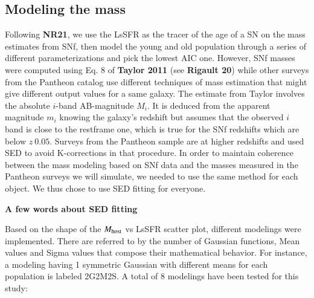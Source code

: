 \documentclass[]{aa}
\begin{document}
\subsection{Modeling the mass}
Following \textbf{NR21}, we use the LsSFR as the tracer of the age of a SN on
the mass estimates from SNf, then model the young and old population through a
series of different parameterizations and pick the lowest AIC one. However, SNf
masses were computed using Eq. 8 of \textbf{Taylor 2011} (see \textbf{Rigault
20}) while other surveys from the Pantheon catalog use different techniques of
mass estimation that might give different output values for a same galaxy. The
estimate from Taylor involves the absolute $i$-band AB-magnitude $M_i$. It is
deduced from the apparent magnitude $m_i$ knowing the galaxy's redshift but
assumes that the observed $i$ band is close to the restframe one, which is true
for the SNf redshifts which are below $z~0.05$. Surveys from the Pantheon sample
are at higher redshifts and used SED to avoid K-corrections in that procedure.
In order to maintain coherence between the mass modeling based on SNf data and
the masses measured in the Pantheon surveys we will simulate, we needed to use
the same method for each object. We thus chose to use SED fitting for everyone.

\textbf{A few words about SED fitting}

Based on the shape of the $M_{\rm host}$ vs LsSFR scatter plot, different
modelings were implemented. There are referred to by the number of Gaussian
functions, Mean values and Sigma values that compose their mathematical
behavior. For instance, a modeling having 1 symmetric Gaussian with different
means for each population is labeled 2G2M2S. A total of 8 modelings have been
tested for this study:
\end{document}

